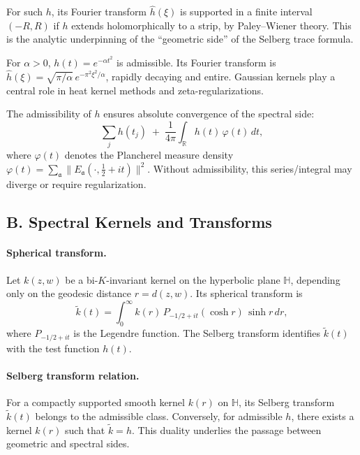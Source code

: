 \begin{remark}
For such $h$, its Fourier transform $\hat h(\xi)$ is supported in a finite interval $(-R,R)$ if $h$ extends holomorphically
to a strip, by Paley–Wiener theory. This is the analytic underpinning of the ``geometric side'' of the Selberg trace formula.
\end{remark}

\begin{example}
For $\alpha>0$, $h(t)=e^{-\alpha t^2}$ is admissible. Its Fourier transform is $\hat h(\xi)=\sqrt{\pi/\alpha}\,e^{-\pi^2\xi^2/\alpha}$,
rapidly decaying and entire. Gaussian kernels play a central role in heat kernel methods and zeta-regularizations.
\end{example}

\begin{remark}
The admissibility of $h$ ensures absolute convergence of the spectral side:
\[
   \sum_j h(t_j) \;+\; \frac{1}{4\pi}\int_{\mathbb{R}} h(t)\,\varphi(t)\,dt,
\]
where $\varphi(t)$ denotes the Plancherel measure density $\varphi(t)=\sum_{\mathfrak a}\|E_{\mathfrak a}(\cdot,\tfrac12+it)\|^2$.
Without admissibility, this series/integral may diverge or require regularization.
\end{remark}

\subsection*{B. Spectral Kernels and Transforms}
\label{subsec:kernels}

\paragraph{Spherical transform.}
Let $k(z,w)$ be a bi-$K$-invariant kernel on the hyperbolic plane $\mathbb{H}$, depending only on the geodesic distance
$r=d(z,w)$. Its spherical transform is
\[
   \tilde k(t) = \int_{0}^\infty k(r)\,P_{-1/2+it}(\cosh r)\,\sinh r\,dr,
\]
where $P_{-1/2+it}$ is the Legendre function. The Selberg transform identifies $\tilde k(t)$ with the test function $h(t)$.

\paragraph{Selberg transform relation.}
For a compactly supported smooth kernel $k(r)$ on $\mathbb{H}$, its Selberg transform $\tilde k(t)$ belongs to the admissible class.
Conversely, for admissible $h$, there exists a kernel $k(r)$ such that $\tilde k=h$. This duality underlies the passage
between geometric and spectral sides.

